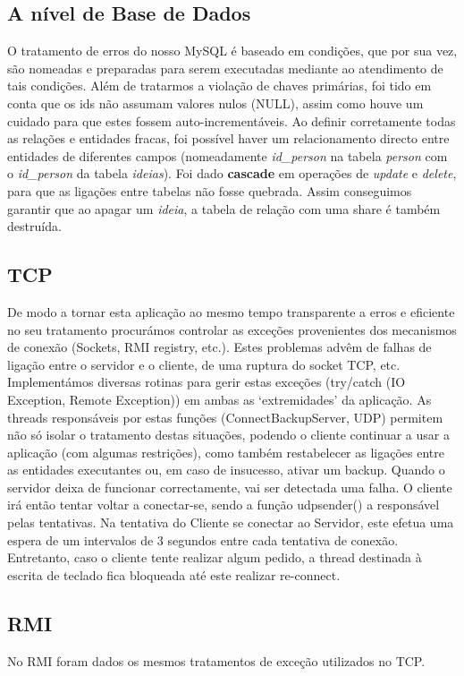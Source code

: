 \documentclass[12pt]{article} %
\begin{document}
\subsection{A nível de Base de Dados}
O tratamento de erros do nosso MySQL é baseado em condições, que por sua vez, são nomeadas e preparadas para serem executadas mediante ao atendimento de tais condições. 
Além de tratarmos a violação de chaves primárias, foi tido em conta que os ids não assumam valores nulos (NULL), assim como houve um cuidado para que estes fossem auto-incrementáveis. Ao definir corretamente todas as relações e entidades fracas, foi possível haver um relacionamento directo entre entidades de diferentes campos (nomeadamente \emph{id\_person} na tabela \emph{person} com o \emph{id\_person} da tabela \emph{ideias}). Foi dado \textbf{cascade} em operações de \emph{update} e \emph{delete}, para que as ligações entre tabelas não fosse quebrada. Assim conseguimos garantir que ao apagar um \emph{ideia}, a tabela de relação com uma share é também destruída. 


\subsection{TCP}
De modo a tornar esta aplicação ao mesmo tempo transparente a erros e eficiente no seu tratamento procurámos controlar as exceções provenientes dos mecanismos de conexão (Sockets, RMI registry, etc.). Estes problemas advêm de falhas de ligação entre o servidor e o cliente, de uma ruptura do socket TCP, etc.
Implementámos diversas rotinas para gerir estas exceções (try/catch (IO Exception, Remote Exception)) em ambas as ‘extremidades’ da aplicação. As threads responsáveis por estas funções (ConnectBackupServer, UDP) permitem não só isolar o tratamento destas situações, podendo o cliente continuar a usar a aplicação (com algumas restrições), como também restabelecer as ligações entre as entidades executantes ou, em caso de insucesso, ativar um backup. 
Quando o servidor deixa de funcionar correctamente, vai ser detectada uma falha. O cliente irá então tentar voltar a conectar-se, sendo a função udpsender() a responsável pelas tentativas.
Na tentativa do Cliente se conectar ao Servidor, este efetua uma espera de um intervalos de 3 segundos entre cada tentativa de conexão. Entretanto, caso o cliente tente realizar algum pedido, a thread destinada à escrita de teclado fica bloqueada até este realizar re-connect.

\subsection{RMI}
No RMI foram dados os mesmos tratamentos de exceção utilizados no TCP.
\end{document}
